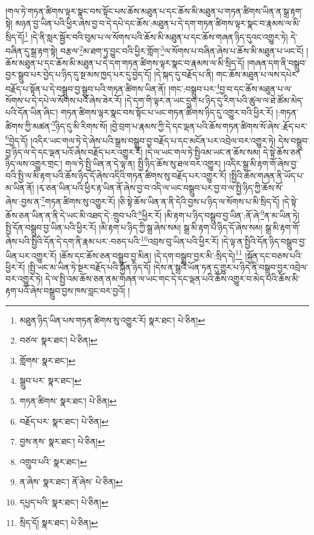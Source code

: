 །གལ་ཏེ་གཏན་ཚིགས་ལྟར་སྣང་བས་སྟོང་པས་ཆོས་མཐུན་པ་དང་ཆོས་མི་མཐུན་པ་གཏན་ཚིགས་ཡིན་ན་སྒྲ་རྟག་སྟེ། མཉན་བྱ་ཡིན་པའི་ཕྱིར་ཞེས་བྱ་བ་དེ་དཔེ་དང་ཆོས་:མཐུན་པ་དེ་དག་གཏན་ཚིགས་ལྟར་སྣང་བ་རྣམས་ལ་མི་སྲིད་དོ།\footnote{མཐུན་ཉིད་ཡིན་པས་གཏན་ཚིགས་སུ་འགྱུར་རོ།  སྣར་ཐང་།  པེ་ཅིན། } །དེ་ནི་སླར་སྦྱོར་བའི་བུམ་པ་ལ་སོགས་པའི་ཆོས་མི་མཐུན་པ་དང་ཆོས་གཞན་ཉིད་དུའང་འགྱུར་ཏེ། དེ་བཞིན་དུ་སྒྲ་རྟག་སྟེ། བརྩལ་\footnote{བཙལ་  སྣར་ཐང་།  པེ་ཅིན། }མ་ཐག་ཏུ་བྱུང་བའི་ཕྱིར་གློག་\footnote{གློགས་  སྣར་ཐང་། }ལ་སོགས་པ་བཞིན་ཞེས་པ་ཆོས་མི་མཐུན་པ་ཡང་ངོ། །ཆོས་མཐུན་པ་དང་ཆོས་མི་མཐུན་པ་དེ་དག་གཏན་ཚིགས་ལྟར་སྣང་བ་རྣམས་ལ་མི་སྲིད་དོ། །གཞན་དག་ནི་བསྒྲུབ་བྱར་སྒྲུབ་པར་བྱེད་པ་ཉིད་དུ་སྔ་མས་ཁྱད་པར་དུ་བྱེད་དོ། །དེ་སྐད་དུ་བརྗོད་པ་ནི། གང་ཆོས་མཐུན་པ་ལས་དཔེར་བརྗོད་པ་སྟོན་པ་དེ་བསྒྲུབ་བྱ་སྒྲུབ་པའི་གཏན་ཚིགས་ཡིན་ནོ། །གང་:བསྒྲུབ་པར་\footnote{སྒྲུབ་པར་  སྣར་ཐང་། }བྱ་བ་དང་ཆོས་མཐུན་པ་ལ་སོགས་པ་དེ་དཔེ་ལ་སོགས་པའོ་ཞེས་ཟེར་རོ། །དེ་དག་གི་ལྟར་ན་ཡང་དྲུག་པ་ཉིད་དུ་རིག་པའི་ཚུལ་ལ་ཐེ་ཚོམ་མེད་པའི་དོན་ཡིན་ཞིང་། གཏན་ཚིགས་ལྟར་སྣང་བས་སྟོང་པ་ཡང་གཏན་ཚིགས་ཉིད་དུ་འགྱུར་བའི་ཕྱིར་རོ། །:གཏན་ཚིགས་ཀྱི་མཚན་\footnote{གཏན་ཚིགས་  སྣར་ཐང་།  པེ་ཅིན། }ཉིད་དུ་མི་རིགས་སོ། །བྱེ་བྲག་པ་རྣམས་ཀྱི་དེ་དང་ལྡན་པའི་ཆོས་གཏན་ཚིགས་སོ་ཞེས་:རྗོད་པར་\footnote{བརྗོད་པར་  སྣར་ཐང་།  པེ་ཅིན། }བྱེད་དོ། །འདིར་ཡང་གལ་ཏེ་དེ་ཞེས་པའི་སྒྲས་བསྒྲུབ་བྱ་བརྗོད་པ་དང་མངོན་པར་འབྲེལ་བར་འགྱུར་ཏེ། དེས་བསྒྲུབ་བྱ་ཉིད་ལ་དེ་དང་ལྡན་པའོ་ཞེས་བརྗོད་པར་འགྱུར་རོ། །དེ་ལ་ཡང་གལ་ཏེ་སྤྱིའམ་ཡང་ན་ཆོས་སམ། དེ་སྟེ་ཆོས་ཅན་ཉིད་ལས་འགྱུར་གྲང་། གལ་ཏེ་སྤྱི་ཡིན་ན་དེ་ལྟ་ན། སྤྱི་ཉིད་ཆོས་སུ་ཐལ་བར་འགྱུར། །འདིར་སྒྲ་མི་རྟག་གོ་ཞེས་བྱ་བའི་སྤྱི་ལ་མི་རྟག་པའི་ཆོས་ཉིད་དོ་ཞེས་འདིའི་གཏན་ཚིགས་སུ་བརྗོད་པར་འགྱུར་རོ། །སྤྱིའི་ཆོས་གཞན་ནི་ཡོད་པ་མ་ཡིན་ནོ། །རྭ་ཅན་ཡིན་པའི་ཕྱིར་རྟ་ཡིན་ནོ་ཞེས་བྱ་བ་འདི་ལ་ཡང་བསྒྲུབ་པར་བྱ་བ་ལ་སྤྱི་ཉིད་ཀྱི་ཆོས་སོ་ཞེས་:བྱས་ན་\footnote{བྱས་ནས་  སྣར་ཐང་།  པེ་ཅིན། }གཏན་ཚིགས་སུ་འགྱུར་རོ། །ཅི་སྟེ་ཆོས་ཡིན་ན་ནི་དེའི་བྱས་པ་ཉིད་ལ་སོགས་པ་མི་སྲིད་དོ། །དེ་སྟེ་ཆོས་ཅན་ཡིན་ན་ནི་དེ་ཡང་མི་འཐད་དེ་:གྲུབ་པའི་\footnote{འགྲུབ་པའི་  སྣར་ཐང་། }ཕྱིར་རོ། །མི་རྟག་པ་ཉིད་བསྒྲུབ་བྱ་ཡིན་:ནོ་ཞེ་\footnote{ན་ཞེས་  སྣར་ཐང་། ནོ་ཞེས་  པེ་ཅིན། }ན་མ་ཡིན་ཏེ། སྤྱི་དོན་བསྒྲུབ་བྱ་ཡིན་པའི་ཕྱིར་རོ། །མི་རྟག་པ་ཉིད་ཀྱི་སྒྲ་ཞེས་སམ། སྒྲ་མི་རྟག་པ་ཉིད་དོ་ཞེས་སམ། སྒྲ་མི་རྟག་གོ་ཞེས་པའི་སྤྱིའི་དོན་དེ་དག་ནི་རྣམ་པར་:བཅད་པའི་\footnote{དཔྱད་པའི་  སྣར་ཐང་།  པེ་ཅིན། }འབྲས་བུ་ཡིན་པའི་ཕྱིར་རོ། །དེ་ལྟ་ན་སྤྱིའི་དོན་ཉིད་བསྒྲུབ་བྱ་ཡིན་པར་འགྱུར་རོ། །ཆོས་དང་ཆོས་ཅན་བསྒྲུབ་བྱ་མིན། །དེ་དག་བསྒྲུབ་བྱར་མི་:སྲིད་དེ།\footnote{སྲིད་དོ།  སྣར་ཐང་།  པེ་ཅིན། } །སྐྱོན་དང་བཅས་པའི་ཕྱིར་རོ། །སྤྱི་ཡང་མ་ཡིན་ཏེ་སྔར་བརྗོད་པའི་སྐྱོན་ཉིད་དོ། །དེས་ན་སྒྲའི་ཡོན་ཏན་དུ་གྱུར་པ་ཉིད་ནི་བསྒྲུབ་བྱར་འབྲེལ་བར་འགྱུར་ཏེ། དེ་ལ་སྤྱི་འམ་ཆོས་ཅན་ནམ་གཞན་ལ་ཡང་གང་དེ་དང་ལྡན་པའི་ཆོས་འགྱུར་བ་མེད་པའི་ཆོས་མི་རྟག་པའོ་ཞེས་བསྒྲུབ་བྱས་ཁས་བླང་བར་བྱའོ། །
